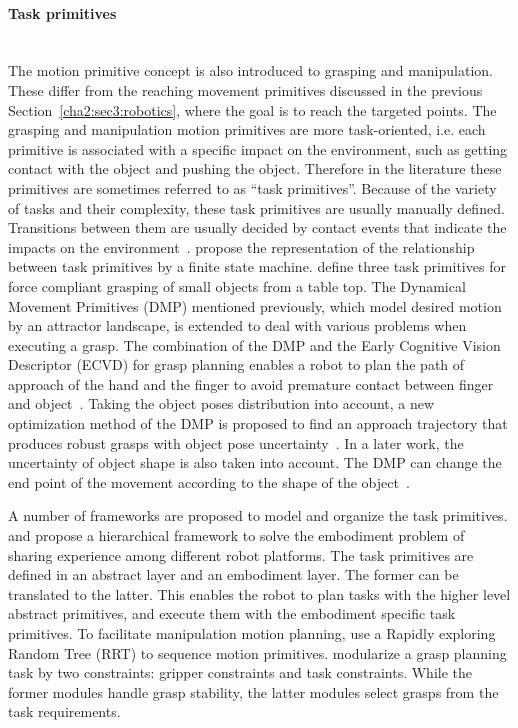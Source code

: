 \paragraph{Task primitives} 
\label{cha2:sec3:robotics:taskprimitives}
~\\
The motion primitive concept is also introduced to grasping and manipulation. These differ from the reaching movement primitives discussed in the previous Section~\ref{cha2:sec3:robotics}, where the goal is to reach the targeted points. The grasping and manipulation motion primitives are more task-oriented, i.e. each primitive is associated with a specific impact on the environment, such as getting contact with the object and pushing the object. Therefore in the literature these primitives are sometimes referred to as ``task primitives''. Because of the variety of tasks and their complexity, these task primitives are usually manually defined. Transitions between them are usually decided by contact events that indicate the impacts on the environment~\citep{morrow1997manipulation}. \citet{michelman1994forming} propose the representation of the relationship between task primitives by a finite state machine. \citet{kazemi2012robust} define three task primitives for force compliant grasping of small objects from a table top. The Dynamical Movement Primitives (DMP) mentioned previously, which model desired motion by an attractor landscape, is extended to deal with various problems when executing a grasp. The combination of the DMP and the Early Cognitive Vision Descriptor (ECVD) for grasp planning enables a robot to plan the path of  approach of the hand and the finger to avoid premature contact between finger and object~\citep{kroemer2011grasping}. Taking the object poses distribution into account, a new optimization method of the DMP is proposed to find an approach trajectory that produces robust grasps with object pose uncertainty~\citep{stulp2011learning}. In a later work, the uncertainty of object shape is also taken into account. The DMP can change the end point of the movement according to the shape of the object~\citep{stulp2012reinforcement}.

A number of frameworks are proposed to model and organize the task primitives. \citet{laaksonen2010embodiment} and \citet{felip2013manipulation} propose a hierarchical framework to solve the embodiment problem of sharing experience among different robot platforms. The task primitives are defined in an abstract layer and an embodiment layer.
The former can be translated to the latter. This enables the robot to plan tasks with the higher level abstract primitives, and execute them with the embodiment specific task primitives. To facilitate manipulation motion planning, \citet{barry2013manipulation} use a Rapidly exploring Random Tree (RRT) to sequence motion primitives. \citet{detry2013generalizing} modularize a grasp planning task by two constraints: gripper constraints and task constraints. While the former modules handle grasp stability, the latter modules select grasps from the task requirements.


